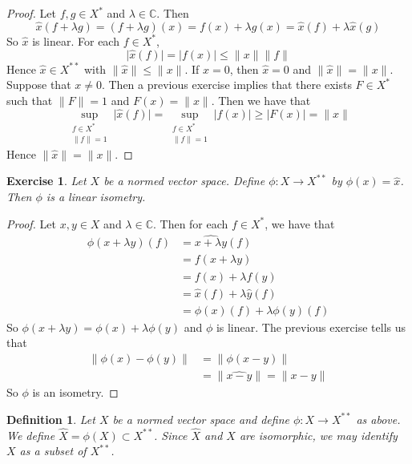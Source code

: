 \documentclass[12pt]{amsart}
\newtheorem{defn}[thm]{Definition}
\newtheorem{ex}[thm]{Exercise}
\newcommand{\lam}{\lambda}
\newcommand{\C}{\mathbb{C}}
\begin{document}
	\begin{proof}
		Let $f,g \in X^*$ and $\lam \in \C$. Then $$\hat{x}(f+\lam g) = (f+ \lam g)(x) = f(x) + \lam g(x) = \hat{x}(f) + \lam \hat{x}(g)$$
		So $\hat{x}$ is linear. For each $f \in X^*$, $$\vert \hat{x}(f) \vert = \vert f(x) \vert \leq \|x \|\|f \|$$ Hence $\hat{x} \in X^{**}$ with $\|\hat{x} \|\leq \|x \|$. If $x=0$, then $\hat{x} = 0$ and $\|\hat{x} \|= \|x \|$. Suppose that $x \neq 0$. Then a previous exercise implies that there exists $F \in X^*$ such that $\|F \|=1$ and $F(x) = \|x \|$. Then we have that $$\sup_{\substack{f \in X^* \\ \|f \|= 1 } } \vert \hat{x}(f) \vert  = \sup_{\substack{f \in X^* \\ \|f \|= 1 }}  \vert f(x) \vert \geq \vert F(x) \vert = \|x \|$$
		Hence $\|\hat{x} \|= \|x \|$.
	\end{proof}
	
	
	\begin{ex}
		Let $X$ be a normed vector space. Define $\phi : X \rightarrow X^{**}$ by $\phi(x) = \hat{x}$. Then $\phi$ is a linear isometry. 
	\end{ex}
	
	\begin{proof}
		Let $x,y \in X$ and $\lam \in \C$. Then for each $f \in X^*$, we have that 
		\begin{align*}
			\phi(x+ \lam y)(f) 
			&= \widehat{x+ \lam y}(f) \\
			&= f(x+\lam y) \\
			&= f(x) + \lam f(y) \\
			&= \hat{x}(f) + \lam \hat{y}(f)\\
			&= \phi(x)(f) + \lam \phi(y)(f)
		\end{align*} 
		So $\phi(x+ \lam y) = \phi(x) + \lam \phi(y)$ and $\phi$ is linear. The previous exercise tells us that 
		\begin{align*}
			\|\phi(x) - \phi(y) \|
			&= \|\phi(x-y)\|\\
			&= \|\widehat{x-y} \|= \|x-y \|
		\end{align*}
		So $\phi$ is an isometry.
	\end{proof}
	
	\begin{defn}
		Let $X$ be a normed vector space and define $\phi:X \rightarrow X^{**}$ as above. We define $\widehat{X} = \phi(X) \subset X^{**}$. Since $\widehat{X}$ and $X$ are isomorphic, we may identify $X$ as a subset of $X^{**}$. 
	\end{defn}
	
\end{document}
